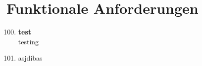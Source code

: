 \chapter{Funktionale Anforderungen}
\begin{enumerate}[label=\textbf{FA\arabic{enumi}0}]
	\setcounter{enumi}{99}
	\item \textbf{test}\\
		testing
	\item asjdibas
\end{enumerate}